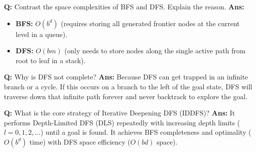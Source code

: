 \documentclass[10pt,a4paper,twocolumn]{article}
\begin{document}
\begin{tcolorbox}[
  colback=white,
  colframe=UnitColorThree,
  colbacktitle=gray!10!white,
  coltitle=black,
  fonttitle=\bfseries\sffamily\small,
  title={Unit III $\bullet$ Card 3: BFS vs. DFS Space Complexity},
  boxrule=1.2pt,
  arc=2mm,
  outer arc=2mm,
  boxsep=1.5mm,
  top=1mm,
  bottom=1mm,
  left=1.5mm,
  right=1.5mm,
  before skip=2.5mm,
  after skip=2.5mm
]
\textbf{Q:} Contrast the space complexities of BFS and DFS. Explain the reason.
\tcbline
\textbf{Ans:} \begin{itemize}
  \item   \textbf{BFS:} $O(b^d)$ (requires storing all generated frontier nodes at the current level in a queue).
  \item   \textbf{DFS:} $O(bm)$ (only needs to store nodes along the single active path from root to leaf in a stack).
\end{itemize}
\end{tcolorbox}


\begin{tcolorbox}[
  colback=white,
  colframe=UnitColorThree,
  colbacktitle=gray!10!white,
  coltitle=black,
  fonttitle=\bfseries\sffamily\small,
  title={Unit III $\bullet$ Card 4: DFS Incompleteness},
  boxrule=1.2pt,
  arc=2mm,
  outer arc=2mm,
  boxsep=1.5mm,
  top=1mm,
  bottom=1mm,
  left=1.5mm,
  right=1.5mm,
  before skip=2.5mm,
  after skip=2.5mm
]
\textbf{Q:} Why is DFS not complete?
\tcbline
\textbf{Ans:} Because DFS can get trapped in an infinite branch or a cycle. If this occurs on a branch to the left of the goal state, DFS will traverse down that infinite path forever and never backtrack to explore the goal.
\end{tcolorbox}


\begin{tcolorbox}[
  colback=white,
  colframe=UnitColorThree,
  colbacktitle=gray!10!white,
  coltitle=black,
  fonttitle=\bfseries\sffamily\small,
  title={Unit III $\bullet$ Card 5: IDDFS Search Strategy},
  boxrule=1.2pt,
  arc=2mm,
  outer arc=2mm,
  boxsep=1.5mm,
  top=1mm,
  bottom=1mm,
  left=1.5mm,
  right=1.5mm,
  before skip=2.5mm,
  after skip=2.5mm
]
\textbf{Q:} What is the core strategy of Iterative Deepening DFS (IDDFS)?
\tcbline
\textbf{Ans:} It performs Depth-Limited DFS (DLS) repeatedly with increasing depth limits ($l = 0, 1, 2, \dots$) until a goal is found. It achieves BFS completeness and optimality ($O(b^d)$ time) with DFS space efficiency ($O(bd)$ space).
\end{tcolorbox}
\end{document}
